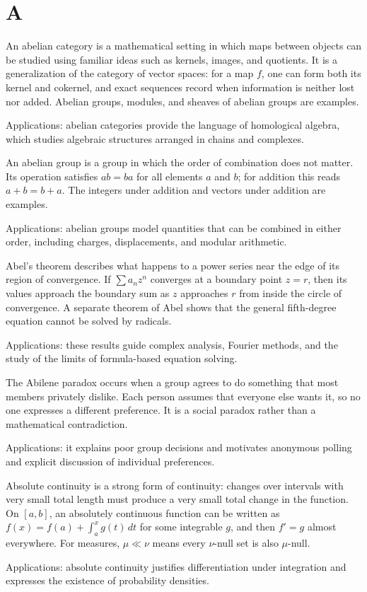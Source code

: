 \chapter*{A}
\label{chap:a}

An abelian category is a mathematical setting in which maps between objects can be studied using familiar ideas such as kernels, images, and quotients. It is a generalization of the category of vector spaces: for a map $f$, one can form both its kernel and cokernel, and exact sequences record when information is neither lost nor added. Abelian groups, modules, and sheaves of abelian groups are examples. \par\noindent Applications: abelian categories provide the language of homological algebra, which studies algebraic structures arranged in chains and complexes.

An abelian group is a group in which the order of combination does not matter. Its operation satisfies $ab=ba$ for all elements $a$ and $b$; for addition this reads $a+b=b+a$. The integers under addition and vectors under addition are examples. \par\noindent Applications: abelian groups model quantities that can be combined in either order, including charges, displacements, and modular arithmetic.

Abel's theorem describes what happens to a power series near the edge of its region of convergence. If $\sum a_nz^n$ converges at a boundary point $z=r$, then its values approach the boundary sum as $z$ approaches $r$ from inside the circle of convergence. A separate theorem of Abel shows that the general fifth-degree equation cannot be solved by radicals. \par\noindent Applications: these results guide complex analysis, Fourier methods, and the study of the limits of formula-based equation solving.

The Abilene paradox occurs when a group agrees to do something that most members privately dislike. Each person assumes that everyone else wants it, so no one expresses a different preference. It is a social paradox rather than a mathematical contradiction. \par\noindent Applications: it explains poor group decisions and motivates anonymous polling and explicit discussion of individual preferences.

Absolute continuity is a strong form of continuity: changes over intervals with very small total length must produce a very small total change in the function. On $[a,b]$, an absolutely continuous function can be written as $f(x)=f(a)+\int_a^x g(t)\,dt$ for some integrable $g$, and then $f'=g$ almost everywhere. For measures, $\mu\ll\nu$ means every $\nu$-null set is also $\mu$-null. \par\noindent Applications: absolute continuity justifies differentiation under integration and expresses the existence of probability densities.

